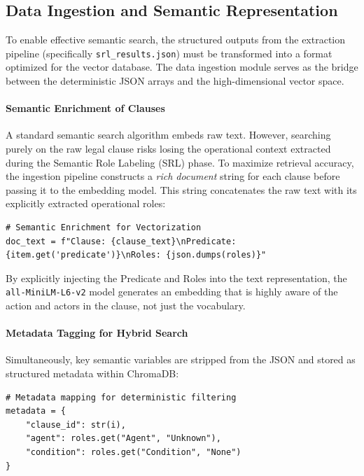 \documentclass[twoside,final]{hcmut-report}
\begin{document}
\subsection{Data Ingestion and Semantic Representation}
\label{sec:data_ingestion_semantics}

To enable effective semantic search, the structured outputs from the extraction pipeline (specifically \texttt{srl\_results.json}) must be transformed into a format optimized for the vector database. The data ingestion module serves as the bridge between the deterministic JSON arrays and the high-dimensional vector space.

\paragraph{Semantic Enrichment of Clauses}
A standard semantic search algorithm embeds raw text. However, searching purely on the raw legal clause risks losing the operational context extracted during the Semantic Role Labeling (SRL) phase. To maximize retrieval accuracy, the ingestion pipeline constructs a \emph{rich document} string for each clause before passing it to the embedding model. This string concatenates the raw text with its explicitly extracted operational roles:

\begin{verbatim}
# Semantic Enrichment for Vectorization
doc_text = f"Clause: {clause_text}\nPredicate: {item.get('predicate')}\nRoles: {json.dumps(roles)}"
\end{verbatim}

By explicitly injecting the Predicate and Roles into the text representation, the \texttt{all-MiniLM-L6-v2} model generates an embedding that is highly aware of the action and actors in the clause, not just the vocabulary.

\paragraph{Metadata Tagging for Hybrid Search}
Simultaneously, key semantic variables are stripped from the JSON and stored as structured metadata within ChromaDB:

\begin{verbatim}
# Metadata mapping for deterministic filtering
metadata = {
    "clause_id": str(i),
    "agent": roles.get("Agent", "Unknown"),
    "condition": roles.get("Condition", "None")
}
\end{verbatim}
\end{document}
